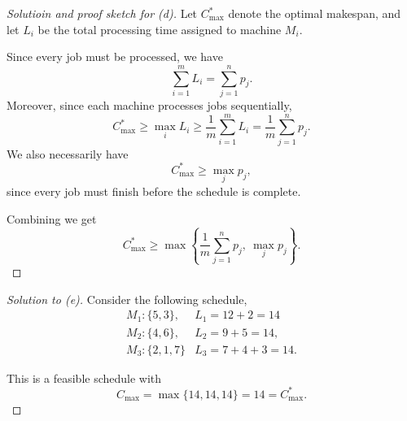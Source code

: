\documentclass[11pt]{article}
\begin{document}
\begin{proof}[Solutioin and proof sketch for (d)]
    Let $C_{\max}^*$ denote the optimal makespan, and 
    let $L_i$ be the total processing time assigned 
    to machine $M_i$. 

    Since every job must be processed, we have 
    \[
        \sum_{i=1}^m L_i = \sum_{j=1}^n p_j. 
    \]
    Moreover, since each machine processes jobs 
    sequentially, 
    \[
        C_{\max}^* \geq \max_i L_i \geq \frac 1 m 
        \sum_{i=1}^m L_i = \frac 1 m \sum_{j=1}^n p_j. 
    \]
    We also necessarily have 
    \[
        C_{\max}^* \geq \max_j p_j, 
    \]
    since every job must finish before the 
    schedule is complete. 

    Combining we get 
    \[
        C_{\max}^* \geq 
        \max \left\{
            \frac 1 m \sum_{j=1}^n p_j, \ \max_j p_j
        \right\}.
    \]
\end{proof}

\begin{proof}[Solution to (e)]
    Consider the following schedule, 
    \begin{align*}
        M_1 : \{5,3\},  & L_1 = 12 + 2 = 14 \\ 
        M_2 : \{4,6\},  & L_2 = 9+5 = 14, \\ 
        M_3 : \{2,1,7\} & L_3 = 7+4+3 = 14.
    \end{align*}

    This is a feasible schedule with 
    \[
        C_{\max} = \max\{14,14,14\} = 14 = C_{\max}^*. 
    \]
\end{proof}
\end{document}
